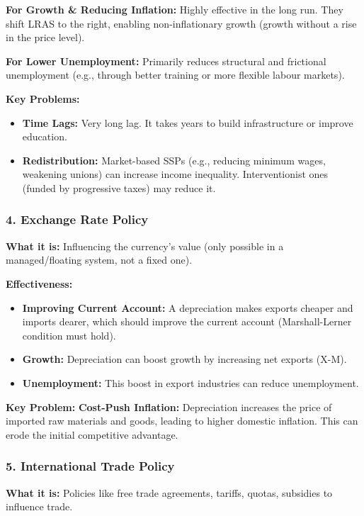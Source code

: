 \documentclass[11pt, a4paper, twoside]{book}
\begin{document}
\textbf{For Growth \& Reducing Inflation:} Highly effective in the long run. They shift LRAS to the right, enabling non-inflationary growth (growth without a rise in the price level).

\textbf{For Lower Unemployment:} Primarily reduces structural and frictional unemployment (e.g., through better training or more flexible labour markets).

\textbf{Key Problems:}
\begin{itemize}
  \item \textbf{Time Lags:} Very long lag. It takes years to build infrastructure or improve education.
  \item \textbf{Redistribution:} Market-based SSPs (e.g., reducing minimum wages, weakening unions) can increase income inequality. Interventionist ones (funded by progressive taxes) may reduce it.
\end{itemize}

\subsubsection{4. Exchange Rate Policy}

\textbf{What it is:} Influencing the currency's value (only possible in a managed/floating system, not a fixed one).

\textbf{Effectiveness:}
\begin{itemize}
  \item \textbf{Improving Current Account:} A depreciation makes exports cheaper and imports dearer, which should improve the current account (Marshall-Lerner condition must hold).
  \item \textbf{Growth:} Depreciation can boost growth by increasing net exports (X-M).
  \item \textbf{Unemployment:} This boost in export industries can reduce unemployment.
\end{itemize}

\textbf{Key Problem:} \textbf{Cost-Push Inflation:} Depreciation increases the price of imported raw materials and goods, leading to higher domestic inflation. This can erode the initial competitive advantage.

\subsubsection{5. International Trade Policy}

\textbf{What it is:} Policies like free trade agreements, tariffs, quotas, subsidies to influence trade.
\end{document}
